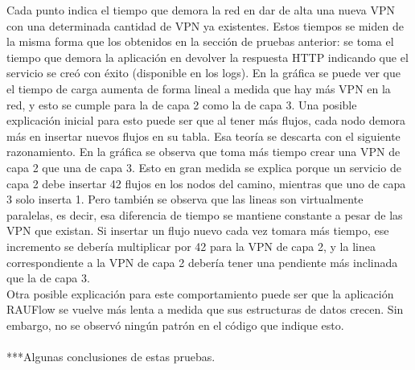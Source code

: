 Cada punto indica el tiempo que demora la red en dar de alta una nueva VPN con una determinada cantidad de VPN ya existentes. Estos tiempos se miden de la misma forma que los obtenidos en la sección de pruebas anterior: se toma el tiempo que demora la aplicación en devolver la respuesta HTTP indicando que el servicio se creó con éxito (disponible en los logs). En la gráfica se puede ver que el tiempo de carga aumenta de forma lineal a medida que hay más VPN en la red, y esto se cumple para la de capa 2 como la de capa 3. Una posible explicación inicial para esto puede ser que al tener más flujos, cada nodo demora más en insertar nuevos flujos en su tabla. Esa teoría se descarta con el siguiente razonamiento. En la gráfica se observa que toma más tiempo crear una VPN de capa 2 que una de capa 3. Esto en gran medida se explica porque un servicio de capa 2 debe insertar 42 flujos en los nodos del camino, mientras que uno de capa 3 solo inserta 1. Pero también se observa que las lineas son virtualmente paralelas, es decir, esa diferencia de tiempo se mantiene constante a pesar de las VPN que existan. Si insertar un flujo nuevo cada vez tomara más tiempo, ese incremento se debería multiplicar por 42 para la VPN de capa 2, y la linea correspondiente a la VPN de capa 2 debería tener una pendiente más inclinada que la de capa 3. \\
Otra posible explicación para este comportamiento puede ser que la aplicación RAUFlow se vuelve más lenta a medida que sus estructuras de datos crecen. Sin embargo, no se observó ningún patrón en el código que indique esto. \\ \\

***Algunas conclusiones de estas pruebas.